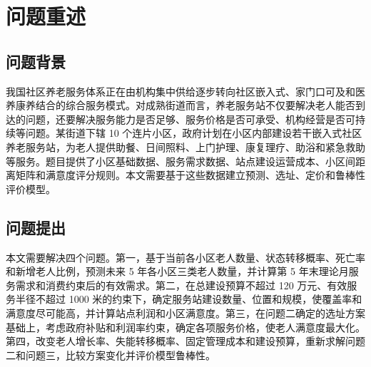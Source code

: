 \section{问题重述}

\subsection{问题背景}

我国社区养老服务体系正在由机构集中供给逐步转向社区嵌入式、家门口可及和医养康养结合的综合服务模式。对成熟街道而言，养老服务站不仅要解决老人能否到达的问题，还要解决服务能力是否足够、服务价格是否可承受、机构经营是否可持续等问题。某街道下辖 10 个连片小区，政府计划在小区内部建设若干嵌入式社区养老服务站，为老人提供助餐、日间照料、上门护理、康复理疗、助浴和紧急救助等服务。题目提供了小区基础数据、服务需求数据、站点建设运营成本、小区间距离矩阵和满意度评分规则。本文需要基于这些数据建立预测、选址、定价和鲁棒性评价模型。

\subsection{问题提出}

本文需要解决四个问题。第一，基于当前各小区老人数量、状态转移概率、死亡率和新增老人比例，预测未来 5 年各小区三类老人数量，并计算第 5 年末理论月服务需求和消费约束后的有效需求。第二，在总建设预算不超过 120 万元、有效服务半径不超过 1000 米的约束下，确定服务站建设数量、位置和规模，使覆盖率和满意度尽可能高，并计算站点利润和小区满意度。第三，在问题二确定的选址方案基础上，考虑政府补贴和利润率约束，确定各项服务价格，使老人满意度最大化。第四，改变老人增长率、失能转移概率、固定管理成本和建设预算，重新求解问题二和问题三，比较方案变化并评价模型鲁棒性。
